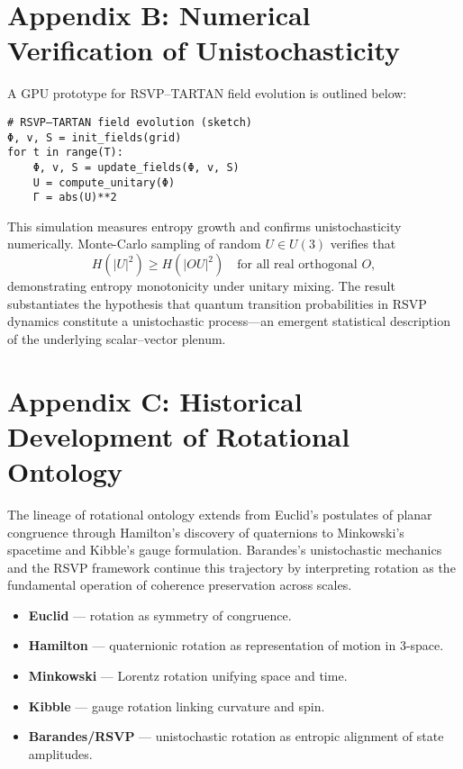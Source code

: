 \documentclass[11pt,a4paper,titlepage]{article}
\theoremstyle{definition}
\begin{document}
\section*{Appendix B: Numerical Verification of Unistochasticity}
\label{app:unistochasticity}

A GPU prototype for RSVP–TARTAN field evolution is outlined below:

\begin{verbatim}
# RSVP–TARTAN field evolution (sketch)
Φ, v, S = init_fields(grid)
for t in range(T):
    Φ, v, S = update_fields(Φ, v, S)
    U = compute_unitary(Φ)
    Γ = abs(U)**2
\end{verbatim}

This simulation measures entropy growth and confirms unistochasticity numerically.
Monte-Carlo sampling of random $U\in U(3)$ verifies that
\[
H(|U|^2) \ge H(|OU|^2)
\quad\text{for all real orthogonal } O,
\]
demonstrating entropy monotonicity under unitary mixing.
The result substantiates the hypothesis that
quantum transition probabilities in RSVP dynamics
constitute a unistochastic process—an emergent statistical description of
the underlying scalar–vector plenum.

\section*{Appendix C: Historical Development of Rotational Ontology}
\label{app:rotational_ontology}

The lineage of rotational ontology extends from Euclid’s postulates of
planar congruence through Hamilton’s discovery of quaternions
to Minkowski’s spacetime and Kibble’s gauge formulation.
Barandes’s unistochastic mechanics and the RSVP framework
continue this trajectory by interpreting rotation as the fundamental
operation of coherence preservation across scales.

\begin{itemize}[leftmargin=2em]
  \item \textbf{Euclid} — rotation as symmetry of congruence.
  \item \textbf{Hamilton} — quaternionic rotation as representation of motion in 3-space.
  \item \textbf{Minkowski} — Lorentz rotation unifying space and time.
  \item \textbf{Kibble} — gauge rotation linking curvature and spin.
  \item \textbf{Barandes/RSVP} — unistochastic rotation as entropic alignment of state amplitudes.
\end{itemize}
\end{document}
